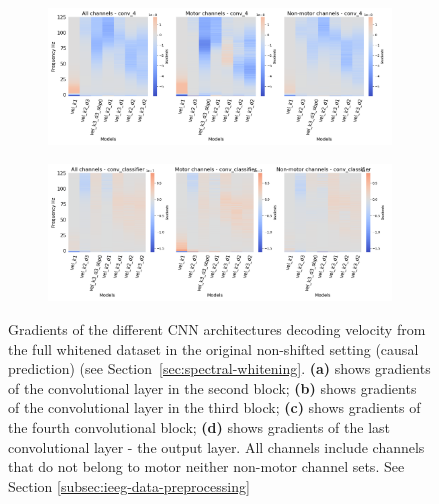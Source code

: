 \begin{figure}[!htbp]\ContinuedFloat

\begin{subfigure}[b]{\textwidth}
   \includegraphics[width=0.85\linewidth]{img/appendix/D/conv-4/m/vel_model_gradients_all_kinds}
   \caption{}
   \label{fig:vel-pw-full-grads-conv-4}
\end{subfigure}

\begin{subfigure}[b]{\textwidth}
   \includegraphics[width=0.85\linewidth]{img/appendix/D/conv-classifier/m/vel_model_gradients_all_kinds}
   \caption{}
   \label{fig:vel-pw-full-grads-conv-classifier}
\end{subfigure}

\caption[]{Gradients of the different CNN architectures decoding velocity from the full whitened dataset in the original non-shifted setting (causal prediction) (see Section~\ref{sec:spectral-whitening}. \textbf{(a)} shows gradients of the convolutional layer in the second block; \textbf{(b)} shows gradients of the convolutional layer in the third block; \textbf{(c)} shows gradients of the fourth convolutional block; \textbf{(d)} shows gradients of the last convolutional layer - the output layer. All channels include channels that do not belong to motor neither non-motor channel sets. See Section \ref{subsec:ieeg-data-preprocessing}}
\label{fig:vel-pw-full-grads}
\end{figure}

\clearpage
